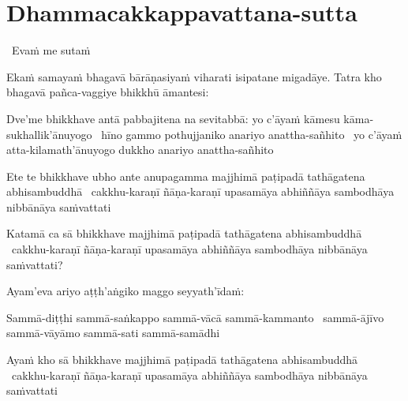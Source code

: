 
\section{Dhammacakkappavattana-sutta}
\label{dhammacakkappavattana-full}

\begin{leader}
  \anglebracketleft\ \hspace{-0.5mm}Evaṁ me sutaṁ \hspace{-0.5mm}\anglebracketright\
\end{leader}

\begin{pali-hang}
  Ekaṁ samayaṁ bhagavā bārāṇasiyaṁ viharati isipatane migadāye. Tatra kho bhagavā pañca-vaggiye bhikkhū āmantesi:
\end{pali-hang}

\begin{pali-hang}
  Dve'me bhikkhave antā pabbajitena na sevitabbā: yo c'āyaṁ kāmesu kāma-sukhallik'ānuyogo \breathmark\ hīno gammo pothujjaniko anariyo anattha-sañhito \breathmark\ yo c'āyaṁ atta-kilamath'ānuyogo dukkho anariyo anattha-sañhito
\end{pali-hang}

\begin{pali-hang}
  Ete te bhikkhave ubho ante anupagamma majjhimā paṭipadā tathāgatena abhisambuddhā \breathmark\ cakkhu-karaṇī ñāṇa-karaṇī upasamāya abhiññāya sambodhāya nibbānāya saṁvattati
\end{pali-hang}

\begin{pali-hang}
  Katamā ca sā bhikkhave majjhimā paṭipadā tathāgatena abhisambuddhā \breathmark\ cakkhu-karaṇī ñāṇa-karaṇī upasamāya abhiññāya sambodhāya nibbānāya saṁvattati?
\end{pali-hang}

\begin{pali-hang}
  Ayam'eva ariyo aṭṭh'aṅgiko maggo seyyath'īdaṁ:
\end{pali-hang}

\begin{pali-hang}
  Sammā-diṭṭhi sammā-saṅkappo sammā-vācā sammā-kammanto \breathmark\ sammā-ājīvo sammā-vāyāmo sammā-sati sammā-samādhi
\end{pali-hang}

\begin{pali-hang}
  Ayaṁ kho sā bhikkhave majjhimā paṭipadā tathāgatena abhisambuddhā \breathmark\ cakkhu-karaṇī ñāṇa-karaṇī upasamāya abhiññāya sambodhāya nibbānāya saṁvattati
\end{pali-hang}

